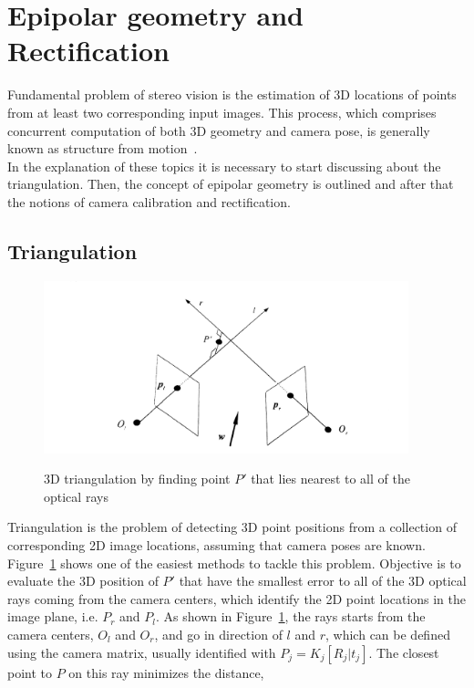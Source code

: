 \section{Epipolar geometry and Rectification}
\label{sec:eipolarandrect}

Fundamental problem of stereo vision is the estimation of 3D locations of points from at least two corresponding input images.
This process, which comprises concurrent computation of both 3D geometry and camera pose, is generally known as structure from motion~\cite{Szeliski2011}.\\
In the explanation of these topics it is necessary to start discussing about the triangulation.
Then, the concept of epipolar geometry is outlined and after that the notions of camera calibration and rectification. 

\subsection{Triangulation}
\label{subsection:triangulation}

\begin{figure}[t]
	\begin{center}
		{\includegraphics[width=.8\textwidth, height=5cm, keepaspectratio]{images/triangulation}}
\caption{3D triangulation by finding point $P'$ that lies nearest to all of the optical rays}
\label{fig:triangulation}
	\end{center}
\end{figure}

Triangulation is the problem of detecting 3D point positions from a collection of corresponding 2D image locations, assuming that camera poses are known.
Figure~\ref{fig:triangulation} shows one of the easiest methods to tackle this problem. 
Objective is to evaluate the 3D position of $P'$ that have the smallest error to all of the 3D optical rays coming from the camera centers, which identify the 2D point locations in the image plane, i.e. $P_r$ and $P_l$.
As shown in Figure~\ref{fig:triangulation}, the rays starts from the camera centers, $O_l$ and $O_r$, and go in direction of $l$ and $r$, which can be defined using the camera matrix, usually identified with $ P_j = K_j [ R_j | t_j ] $.
The closest point to $P$ on this ray minimizes the distance,

